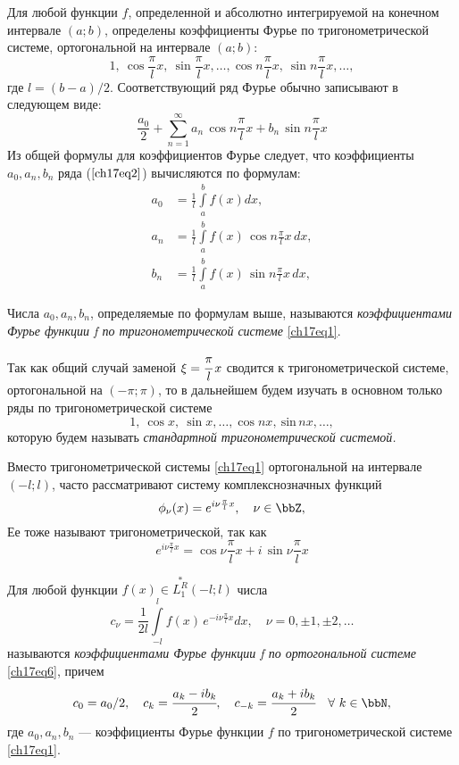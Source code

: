 Для любой функции $f$, определенной и абсолютно интегрируемой на конечном интервале $(a;b)$, определены коэффициенты Фурье по тригонометрической системе, ортогональной на интервале $(a;b)$:
\begin{equation} \label{ch17eq1}
1,\ \cos \frac{\pi}{l}x,\ \sin \frac{\pi}{l}x,\ldots,\cos n\frac{\pi}{l}x,\ \sin n\frac{\pi}{l}x,\ldots,
\end{equation}
где $l = (b - a)/2$. Соответствующий ряд Фурье обычно записывают в следующем виде:
\begin{equation} \label{ch17eq2}
\frac{a_0}{2} + \sum_{n = 1}^{\infty} a_{n}\,\cos n\frac{\pi}{l}x + b_{n}\, \sin n\frac{\pi}{l}x
\end{equation}
Из общей формулы для коэффициентов Фурье следует, что коэффициенты $a_0, a_n, b_n$ ряда ($\ref{ch17eq2}$) вычисляются по формулам:
\begin{align} \label{ch17eq3}
a_0 &= \frac{1}{l} \int\limits_{a}^{b} f(x)dx,\\
a_n &= \frac{1}{l} \int\limits_{a}^{b} f(x)\,\cos n\frac{\pi}{l}x\, dx,\\
b_n &= \frac{1}{l} \int\limits_{a}^{b} f(x)\,\sin n\frac{\pi}{l}x\, dx,
\end{align}

\begin{defn}
Числа $a_0, a_n, b_n$, определяемые по формулам выше, называются \textit{коэффициентами Фурье функции f по тригонометрической системе} \eqref{ch17eq1}.
\end{defn}

Так как общий случай заменой $\xi = \cfrac{\pi}{l}\, x$ сводится к тригонометрической системе, ортогональной на $(-\pi;\pi)$, то в дальнейшем будем изучать в основном только ряды по тригонометрической системе
$$
1,\ \cos x,\ \sin x,\ldots,\cos nx,\ \text{sin}\, nx,\ldots,
$$
которую будем называть \textit{стандартной тригонометрической системой.}

Вместо тригонометрической системы \eqref{ch17eq1} ортогональной на интервале $(-l;l)$, часто рассматривают систему комплекснозначных функций
\begin{equation} \label{ch17eq6}
\phi_{\nu}(x) = e^{i\nu\frac{\pi}{l}x},\quad \nu \in \bbZ,
\end{equation}
Ее тоже называют тригонометрической, так как
$$
e^{i\nu\frac{\pi}{l}x} = \cos \nu\frac{\pi}{l}x + i\, \sin \nu\frac{\pi}{l}x
$$
\begin{defn}
Для любой функции $f(x) \in \overset{*}{L^{R}_1}(-l;l)$ числа
\begin{equation}
c_{\nu} = \frac{1}{2l} \int\limits_{-l}^{l} f(x)\, e^{-i\nu\frac{\pi}{l}x}dx,\quad \nu = 0,\pm 1, \pm 2,\ldots
\end{equation}
называются \textit{коэффициентами Фурье функции f по ортогональной системе} \eqref{ch17eq6}, причем
\begin{equation}
c_0 = a_0/2, \quad c_{k} = \cfrac{a_k - ib_k}{2}, \quad c_{-k} = \cfrac{a_k + ib_k}{2} \quad \forall\ k \in \bbN,
\end{equation}
где $a_0, a_n, b_n$ --- коэффициенты Фурье функции $f$ по тригонометрической системе \eqref{ch17eq1}.
\end{defn}

